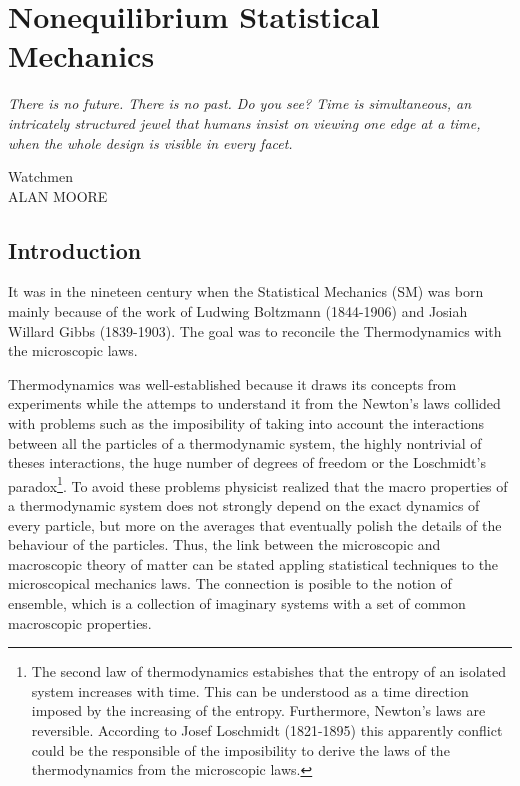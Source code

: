 \documentclass[a4paper,openright,12pt]{book}
\begin{document}
\chapter{Nonequilibrium Statistical Mechanics}\label{cap.NESM}
\epigraph{\textit{There is no future. There is no past. Do you see? Time is simultaneous, an intricately structured jewel that humans insist on viewing one edge at a time, when the whole design is visible in every facet.}}{Watchmen \\ ALAN MOORE}

\section{Introduction}
It was in the nineteen century when the Statistical Mechanics (SM) was born mainly because of the work of Ludwing Boltzmann (1844-1906) and Josiah Willard Gibbs (1839-1903). The goal was to reconcile the Thermodynamics with the microscopic laws. 

Thermodynamics was well-established because it draws its concepts from experiments while the attemps to understand it from the Newton's laws collided with problems such as the imposibility of taking into account the interactions between all the particles of a thermodynamic system, the highly nontrivial of theses interactions, the huge number of degrees of freedom or the Loschmidt's paradox\footnote{The second law of thermodynamics estabishes that the entropy of an isolated system increases with time. This can be understood as a time direction imposed by the increasing of the entropy. Furthermore, Newton's laws are reversible. According to Josef Loschmidt (1821-1895) this apparently conflict could be the responsible of the imposibility to derive the laws of the thermodynamics from the microscopic laws.}. 
To avoid these problems physicist realized that the macro properties of a thermodynamic system does not strongly depend on the exact dynamics of every particle, but more on the averages that eventually polish the details of the behaviour of the particles. 
Thus, the link between the microscopic and macroscopic theory of matter can be stated appling statistical techniques to the microscopical mechanics laws. 
The connection is posible to the notion of ensemble, which is a collection of imaginary systems with a set of common macroscopic properties.  
\end{document}
